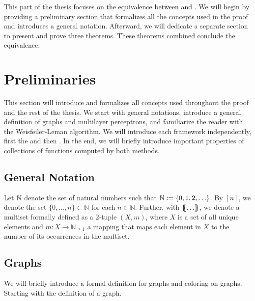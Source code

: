 This part of the thesis focuses on the equivalence between \wlnn and \gnn. We will begin by providing a preliminary section that formalizes all the concepts used in the proof and introduces a general notation. Afterward, we will dedicate a separate section to present and prove three theorems. These theorems combined conclude the equivalence.

\section{Preliminaries}\label{sec:pre_lim}
This section will introduce and formalizes all concepts used throughout the proof and the rest of the thesis. We start with general notations, introduce a general definition of graphs and multilayer perceptrons, and familiarize the reader with the Weisfeiler-Leman algorithm. We will introduce each framework independently, first the \wlnn and then \gnn. In the end, we will briefly introduce important properties of collections of functions computed by both methods.

\subsection{General Notation}
Let $\mathbb{N}$ denote the set of natural numbers such that $\mathbb{N} := \{0, 1,2, \ldots \}$. By $[n]$, we denote the set $\{0, \ldots, n\} \subset \mathbb{N}$ for each $n \in \mathbb{N}$. Further, with $\{\!\!\{ \ldots \}\!\!\}$, we denote a multiset formally defined as a 2-tuple $(X, m)$, where $X$ is a set of all unique elements and $m: X \rightarrow \mathbb{N}_{\geq 1}$ a mapping that maps each element in $X$ to the number of its occurrences in the multiset.

\subsection{Graphs}
We will briefly introduce a formal definition for graphs and coloring on graphs. Starting with the definition of a graph.

